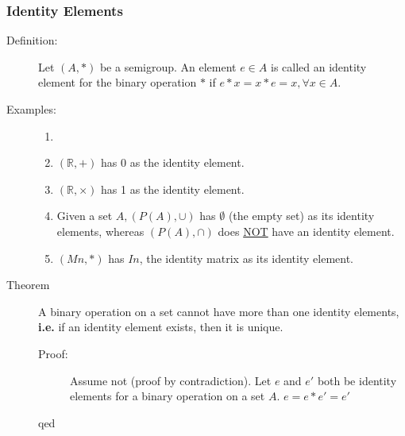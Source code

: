 \documentclass[10pt]{article}
\begin{document}
	\subsubsection{Identity Elements}
	\begin{description}
		\item[Definition:] Let $(A, *)$ be a semigroup. An element $e \in A$ is called an identity element for the binary operation $*$ if $e*x = x*e = x, \forall x \in A$.
		\item[Examples:]
		\begin{enumerate}
			\item[]
			\item $(\mathbb{R}, +)$ has 0 as the identity element.
			\item $(\mathbb{R}, \times)$ has 1 as the identity element.
			\item Given a set $A, (P(A), \cup)$ has $\emptyset$ (the empty set) as its identity elements, whereas $(P(A), \cap)$ does \underline{NOT} have an identity element.
			\item $(Mn, *)$ has $In$, the identity matrix as its identity element.
		\end{enumerate}
		\item[Theorem] A binary operation on a set cannot have more than one identity elements, \textbf{i.e.} if an identity element exists, then it is unique.
		\begin{description}
			\item[Proof:] Assume not (proof by contradiction). Let $e$ and $e'$ both be identity elements for a binary operation on a set $A$. $e=e*e'=e'$
			\item[qed]
		\end{description}
	\end{description}
	
\end{document}
